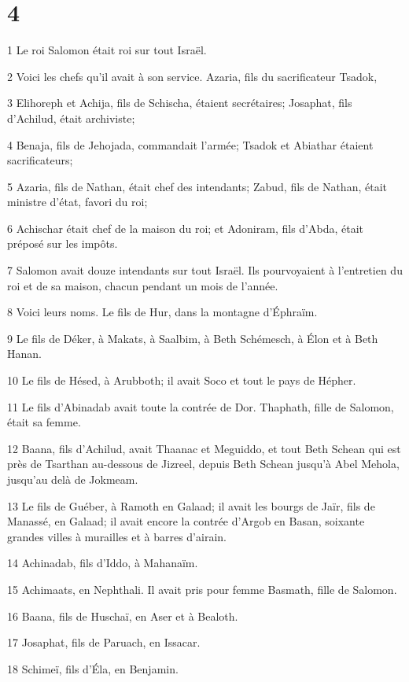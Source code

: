 \chapter{4}

\par 1 Le roi Salomon était roi sur tout Israël.
\par 2 Voici les chefs qu'il avait à son service. Azaria, fils du sacrificateur Tsadok,
\par 3 Elihoreph et Achija, fils de Schischa, étaient secrétaires; Josaphat, fils d'Achilud, était archiviste;
\par 4 Benaja, fils de Jehojada, commandait l'armée; Tsadok et Abiathar étaient sacrificateurs;
\par 5 Azaria, fils de Nathan, était chef des intendants; Zabud, fils de Nathan, était ministre d'état, favori du roi;
\par 6 Achischar était chef de la maison du roi; et Adoniram, fils d'Abda, était préposé sur les impôts.
\par 7 Salomon avait douze intendants sur tout Israël. Ils pourvoyaient à l'entretien du roi et de sa maison, chacun pendant un mois de l'année.
\par 8 Voici leurs noms. Le fils de Hur, dans la montagne d'Éphraïm.
\par 9 Le fils de Déker, à Makats, à Saalbim, à Beth Schémesch, à Élon et à Beth Hanan.
\par 10 Le fils de Hésed, à Arubboth; il avait Soco et tout le pays de Hépher.
\par 11 Le fils d'Abinadab avait toute la contrée de Dor. Thaphath, fille de Salomon, était sa femme.
\par 12 Baana, fils d'Achilud, avait Thaanac et Meguiddo, et tout Beth Schean qui est près de Tsarthan au-dessous de Jizreel, depuis Beth Schean jusqu'à Abel Mehola, jusqu'au delà de Jokmeam.
\par 13 Le fils de Guéber, à Ramoth en Galaad; il avait les bourgs de Jaïr, fils de Manassé, en Galaad; il avait encore la contrée d'Argob en Basan, soixante grandes villes à murailles et à barres d'airain.
\par 14 Achinadab, fils d'Iddo, à Mahanaïm.
\par 15 Achimaats, en Nephthali. Il avait pris pour femme Basmath, fille de Salomon.
\par 16 Baana, fils de Huschaï, en Aser et à Bealoth.
\par 17 Josaphat, fils de Paruach, en Issacar.
\par 18 Schimeï, fils d'Éla, en Benjamin.
